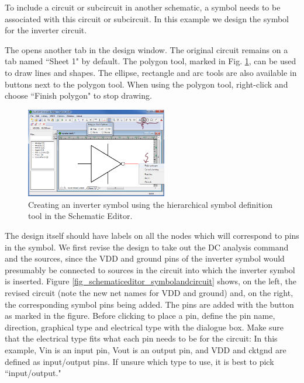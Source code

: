 To include a circuit or subcircuit in another schematic, a symbol needs to be associated with this circuit or subcircuit.  In this example we design the symbol for the inverter circuit.  

The  opens another tab in the design window.    The original circuit remains on a tab named ``Sheet 1" by default.  The polygon tool, marked in Fig. \ref{fig_schematiceditor_symbol1}, can be used to draw lines and shapes.  The ellipse, rectangle and arc tools are also available in buttons next to the polygon tool. When using the polygon tool, right-click and choose \textsf{``Finish polygon"} to stop drawing. 

\begin{figure}[hbt]
\centering
  \includegraphics[width=0.55\textwidth]
	{./figures/getting_started_figures/SchematicEditor_drawingsymbol1.png}
  \caption{Creating an inverter symbol using the hierarchical symbol definition tool in the Schematic Editor.}
  \label{fig_schematiceditor_symbol1}
\end{figure}

 The design itself should have labels on all the nodes which will correspond to pins in the symbol.  We first revise the design to take out the DC analysis command and the sources, since the VDD and ground pins of the inverter symbol would presumably be connected to sources in the circuit into which the inverter symbol is inserted.  Figure \ref{fig_schematiceditor_symbolandcircuit} shows, on the left, the revised circuit (note the new net names for VDD and ground) and, on the right, the corresponding symbol pins being added.  The pins are added with the  button as marked in the figure.  Before clicking to place a pin, define the pin name, direction, graphical type and electrical type with the dialogue box.  Make sure that the electrical type fits what each pin needs to be for the circuit: In this example, \textsf{Vin} is an input pin, \textsf{Vout} is an output pin, and \textsf{VDD} and \textsf{cktgnd} are defined as input/output pins.  If unsure which type to use, it is best to pick ``input/output." 

